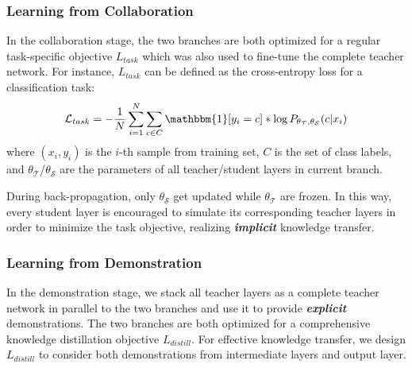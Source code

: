 \subsubsection{Learning from Collaboration}
In the collaboration stage, the two branches are both optimized for a regular task-specific objective $L_{task}$ which was also used to fine-tune the complete teacher network. 
For instance, $L_{task}$ can be defined as the cross-entropy loss for a classification task:
\begin{align}
    \mathcal{L}_{task}=-\frac{1}{N}\sum_{i=1}^N\sum_{c\in C}\mathbbm{1}[y_i=c]*\log{P_{\theta_{\mathcal{T}},\theta_{\mathcal{S}}}(c|x_i)} 
\end{align}
where $(x_i, y_i)$ is the $i$-th sample from training set, $C$ is the set of class labels, and $\theta_{\mathcal{T}}$/$\theta_{\mathcal{S}}$ are the parameters of all teacher/student layers in current branch. 

During back-propagation, only $\theta_{\mathcal{S}}$ get updated while $\theta_{\mathcal{T}}$ are frozen. 
In this way, every student layer is encouraged to simulate its corresponding teacher layers in order to minimize the task objective, realizing \textit{\textbf{implicit}} knowledge transfer.

\subsubsection{Learning from Demonstration}
In the demonstration stage, we stack all teacher layers as a complete teacher network in parallel to the two branches and use it to provide \textit{\textbf{explicit}} demonstrations. 
The two branches are both optimized for a comprehensive knowledge distillation objective $L_{distill}$. For effective knowledge transfer, we design $L_{distill}$ to consider both demonstrations from intermediate layers and output layer.

